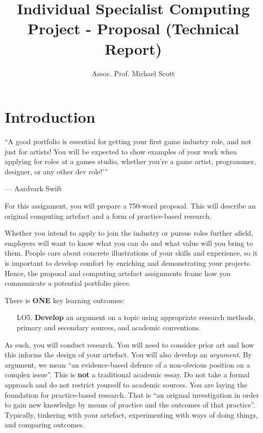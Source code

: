 \documentclass{../../fal_assignment}
\title{Individual Specialist Computing Project - Proposal (Technical Report)}
\author{Assoc. Prof. Michael Scott}
\begin{document}
\maketitle

\section*{Introduction}

\begin{marginquote}
``A good portfolio is essential for getting your first game industry role, and not just for artists! You will be expected to show examples of your work when applying for roles at a games studio, whether you’re a game artist, programmer, designer, or any other dev role!'\thinspace''

--- Aardvark Swift
\end{marginquote}

For this assignment, you will prepare a 750-word proposal. This will describe an original computing artefact and a form of practice-based research. 

Whether you intend to apply to join the industry or pursue roles further afield, employers will want to know what you can do and what value will you bring
to them. People care about concrete illustrations of your skills and experience, so it is important to develop comfort by enriching and demonstrating
your projects. Hence, the proposal and computing artefact assignments frame how you communicate a potential portfolio piece.
 
There is \textbf{ONE} key learning outcomes:

\begin{itemize}
	\setlength{\itemindent}{1em}
	\item[LO5. ] \textbf{Develop} an argument on a topic using appropriate research methods, primary and secondary sources, and academic conventions.
\end{itemize}

As such, you will conduct research. You will need to consider prior art and how this informs the design of your artefact. You will also develop an \textit{argument}. By argument, we mean ``an evidence-based defence of a non-obvious position on a complex issue''. This is \textbf{not} a traditional academic essay. Do not take a formal approach and do not restrict yourself to academic sources. You are laying the foundation for practice-based research. That is ``an original investigation in order to gain new knowledge by means of practice and the outcomes of that practice''. Typically, tinkering with your artefact, experimenting with ways of doing things, and comparing outcomes.
\end{document}
